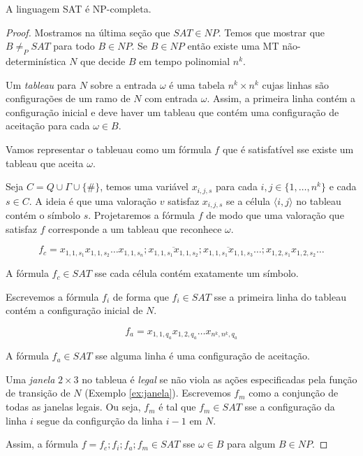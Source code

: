 \begin{theorem}
A linguagem SAT é NP-completa.
\end{theorem}
\begin{proof}
  Mostramos na última seção que $SAT \in NP$.
  Temos que mostrar que $B \neq_P SAT$ para todo $B \in NP$.
  Se $B \in NP$ então existe uma MT não-determinística $N$ que decide $B$ em tempo polinomial $n^k$.

  Um {\em tableau} para $N$ sobre a entrada $\omega$ é uma tabela $n^k \times n^k$ cujas linhas são configurações de um ramo de $N$ com entrada $\omega$.
  Assim, a primeira linha contém a configuração inicial e deve haver um tableau que contém uma configuração de aceitação para cada $\omega \in B$.


  Vamos representar o tableuau como um fórmula $f$ que é satisfatível sse existe um tableau que aceita $\omega$.

  Seja $C = Q \cup \Gamma \cup \{\#\}$, temos uma variável $x_{i,j,s}$ para cada $i,j \in \{1, \dots, n^k\}$ e cada $s \in C$.
  A ideia é que uma valoração $v$ satisfaz $x_{i,j,s}$ se a célula $\langle i, j \rangle$ no tableau contém o símbolo $s$.
  Projetaremos a fórmula $f$ de modo que uma valoração que satisfaz $f$ corresponde a um tableau que reconhece $\omega$.

  \begin{displaymath}
    f_c = x_{1,1,s_1}x_{1,1,s_2} \dots x_{1,1,s_n}; \overline{x_{1,1,s_1}x_{1,1,s_2}}; \overline{x_{1,1,s_1}x_{1,1,s_3}} \dots; x_{1,2,s_1}x_{1,2,s_2} \dots
  \end{displaymath}

  A fórmula $f_c \in SAT$ sse cada célula contém exatamente um símbolo.

  Escrevemos a fórmula $f_i$ de forma que $f_i \in SAT$ sse a primeira linha do tableau contém a configuração inicial de $N$.

  \begin{displaymath}
    f_a = x_{1,1,q_a}x_{1,2,q_a} \dots x_{n^k,n^k, q_a}
  \end{displaymath}

  A fórmula $f_a \in SAT$ sse alguma linha é uma configuração de aceitação.

  Uma {\em janela} $2 \times 3$ no tableua é {\em legal} se não viola as ações especificadas pela função de transição de $N$ (Exemplo \ref{ex:janela}).
  Escrevemos $f_m$ como a conjunção de todas as janelas legais.
  Ou seja, $f_m$ é tal que $f_m \in SAT$ sse a configuração da linha $i$ segue da configurção da linha $i-1$ em $N$.

  Assim, a fórmula $f = f_c;f_i;f_a;f_m \in SAT$ sse $\omega \in B$ para algum $B \in NP$. 
\end{proof}

